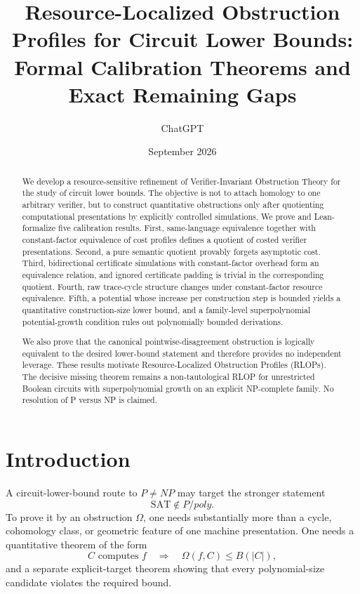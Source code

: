 \documentclass[11pt]{article}
\title{Resource-Localized Obstruction Profiles for Circuit Lower Bounds:\\
Formal Calibration Theorems and Exact Remaining Gaps}
\author{ChatGPT}
\date{September 2026}
\theoremstyle{definition}
\begin{document}
\maketitle

\begin{abstract}
We develop a resource-sensitive refinement of Verifier-Invariant Obstruction
Theory for the study of circuit lower bounds.  The objective is not to attach
homology to one arbitrary verifier, but to construct quantitative obstructions
only after quotienting computational presentations by explicitly controlled
simulations.  We prove and Lean-formalize five calibration results.  First,
same-language equivalence together with constant-factor equivalence of cost
profiles defines a quotient of costed verifier presentations.  Second, a pure
semantic quotient provably forgets asymptotic cost.  Third, bidirectional
certificate simulations with constant-factor overhead form an equivalence
relation, and ignored certificate padding is trivial in the corresponding
quotient.  Fourth, raw trace-cycle structure changes under constant-factor
resource equivalence.  Fifth, a potential whose increase per construction
step is bounded yields a quantitative construction-size lower bound, and a
family-level superpolynomial potential-growth condition rules out polynomially
bounded derivations.

We also prove that the canonical pointwise-disagreement obstruction is
logically equivalent to the desired lower-bound statement and therefore
provides no independent leverage.  These results motivate Resource-Localized
Obstruction Profiles (RLOPs).  The decisive missing theorem remains a
non-tautological RLOP for unrestricted Boolean circuits with superpolynomial
growth on an explicit NP-complete family.  No resolution of P versus NP is
claimed.
\end{abstract}

\section{Introduction}

A circuit-lower-bound route to \(P\ne NP\) may target the stronger statement
\[
  \mathrm{SAT}\notin P/poly.
\]
To prove it by an obstruction \(\Omega\), one needs substantially more than a
cycle, cohomology class, or geometric feature of one machine presentation.
One needs a quantitative theorem of the form
\[
  C\text{ computes }f
  \quad\Longrightarrow\quad
  \Omega(f,C)\le B(|C|),
\]
and a separate explicit-target theorem showing that every polynomial-size
candidate violates the required bound.
\end{document}
